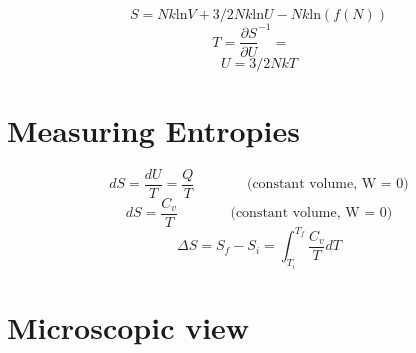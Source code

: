 \documentclass[twoside]{article}
\begin{document}
\begin{equation} S = Nk\text{ln}V + 3/2Nk\text{ln}U - Nk\text{ln}(f(N)) \end{equation}
\begin{equation} T = \frac {\partial{S}} {\partial{U}} ^{-1} = ~~~~~\end{equation}
\begin{equation} U = 3/2NkT \end{equation}


\section{Measuring Entropies}
\begin{equation} dS = \frac{dU}{T} = \frac{Q}{T}   ~~~~~~~~~~~~~~~~~ \text{(constant volume, W = 0)}\end{equation}
\begin{equation} dS = \frac{C_v}{T}   ~~~~~~~~~~~~~~~~~ \text{(constant volume, W = 0)}\end{equation}
\begin{equation} \Delta{S} = S_f-S_i = \int^{T_f}_{T_i} \frac{C_v}{T} dT \end{equation}

\section{Microscopic view}
\end{document}
